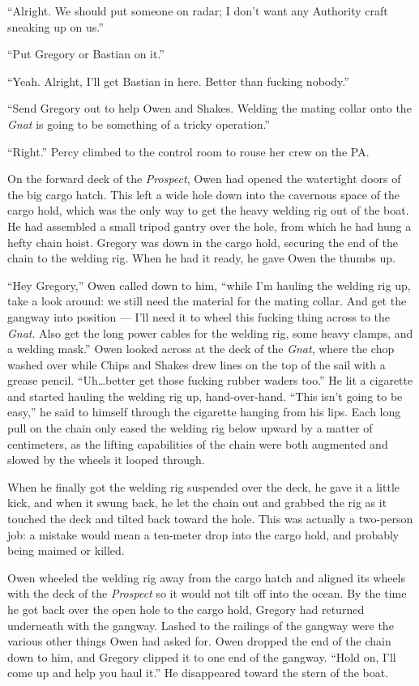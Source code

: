 \documentclass[
]{scrbook}
\begin{document}
``Alright. We should put someone on radar; I don't want any Authority
craft sneaking up on us.''

``Put Gregory or Bastian on it.''

``Yeah. Alright, I'll get Bastian in here. Better than fucking nobody.''

``Send Gregory out to help Owen and Shakes. Welding the mating collar
onto the \emph{Gnat} is going to be something of a tricky operation.''

``Right.'' Percy climbed to the control room to rouse her crew on the
PA.

\bigskip

On the forward deck of the \emph{Prospect}, Owen had opened the
watertight doors of the big cargo hatch. This left a wide hole down into
the cavernous space of the cargo hold, which was the only way to get the
heavy welding rig out of the boat. He had assembled a small tripod
gantry over the hole, from which he had hung a hefty chain hoist.
Gregory was down in the cargo hold, securing the end of the chain to the
welding rig. When he had it ready, he gave Owen the thumbs up.

``Hey Gregory,'' Owen called down to him, ``while I'm hauling the
welding rig up, take a look around: we still need the material for the
mating collar. And get the gangway into position --- I'll need it to
wheel this fucking thing across to the \emph{Gnat}. Also get the long
power cables for the welding rig, some heavy clamps, and a welding
mask.'' Owen looked across at the deck of the \emph{Gnat}, where the
chop washed over while Chips and Shakes drew lines on the top of the
sail with a grease pencil. ``Uh\ldots better get those fucking rubber
waders too.'' He lit a cigarette and started hauling the welding rig up,
hand-over-hand. ``This isn't going to be easy,'' he said to himself
through the cigarette hanging from his lips. Each long pull on the chain
only eased the welding rig below upward by a matter of centimeters, as
the lifting capabilities of the chain were both augmented and slowed by
the wheels it looped through.

When he finally got the welding rig suspended over the deck, he gave it
a little kick, and when it swung back, he let the chain out and grabbed
the rig as it touched the deck and tilted back toward the hole. This was
actually a two-person job: a mistake would mean a ten-meter drop into
the cargo hold, and probably being maimed or killed.

Owen wheeled the welding rig away from the cargo hatch and aligned its
wheels with the deck of the \emph{Prospect} so it would not tilt off
into the ocean. By the time he got back over the open hole to the cargo
hold, Gregory had returned underneath with the gangway. Lashed to the
railings of the gangway were the various other things Owen had asked
for. Owen dropped the end of the chain down to him, and Gregory clipped
it to one end of the gangway. ``Hold on, I'll come up and help you haul
it.'' He disappeared toward the stern of the boat.
\end{document}
